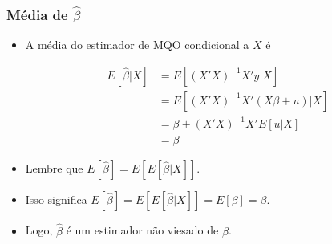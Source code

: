 \documentclass[10pt,slides,xcolor=pdftex,dvipsnames,table]{beamer}
\begin{document}

\begin{frame}[fragile]
	\frametitle{Média de $\widehat{\beta}$}

\begin{itemize}\itemsep1.2em

\item A média do estimador de MQO condicional a $X$ é

\begin{align*}
E [\widehat{\beta} | X] &= E \left[ (X'X)^{-1} X'y | X \right] \\
&= E \left[ (X'X)^{-1} X'(X \beta + u) | X \right] \\
&= \beta + (X'X)^{-1} X' E[u | X] \\ 
&= \beta 
\end{align*}

\item Lembre que $E[\widehat{\beta}] = E \left[E [\widehat{\beta} | X] \right]$.

\item Isso significa $E[\widehat{\beta}] = E \left[E [\widehat{\beta} | X] \right] = E[\beta]=\beta$.  

\item Logo, $\widehat{\beta}$ é um estimador não viesado de $\beta$.

\end{itemize}

\end{frame}

\end{document}
